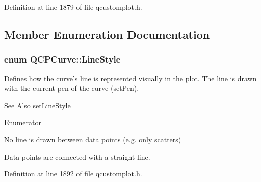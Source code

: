 Definition at line 1879 of file qcustomplot.\-h.



\subsection{Member Enumeration Documentation}
\hypertarget{class_q_c_p_curve_a2710e9f79302152cff794c6e16cc01f1}{
\subsubsection[{Line\-Style}]{\setlength{\rightskip}{0pt plus 5cm}enum {\bf Q\-C\-P\-Curve\-::\-Line\-Style}}}\label{class_q_c_p_curve_a2710e9f79302152cff794c6e16cc01f1}
Defines how the curve's line is represented visually in the plot. The line is drawn with the current pen of the curve (\hyperlink{class_q_c_p_abstract_plottable_ab74b09ae4c0e7e13142fe4b5bf46cac7}{set\-Pen}). \begin{DoxySeeAlso}{See Also}
\hyperlink{class_q_c_p_curve_a4a377ec863ff81a1875c3094a6177c19}{set\-Line\-Style} 
\end{DoxySeeAlso}
\begin{Desc}
\item[Enumerator]\par
\begin{description}
\item[{\em 
\hypertarget{class_q_c_p_curve_a2710e9f79302152cff794c6e16cc01f1aec1601a191cdf0b4e761c4c66092cc48}{ls\-None}\label{class_q_c_p_curve_a2710e9f79302152cff794c6e16cc01f1aec1601a191cdf0b4e761c4c66092cc48}
}]No line is drawn between data points (e.\-g. only scatters) \item[{\em 
\hypertarget{class_q_c_p_curve_a2710e9f79302152cff794c6e16cc01f1ade5822ce6fbf131d3df131795c2e1003}{ls\-Line}\label{class_q_c_p_curve_a2710e9f79302152cff794c6e16cc01f1ade5822ce6fbf131d3df131795c2e1003}
}]Data points are connected with a straight line. \end{description}
\end{Desc}


Definition at line 1892 of file qcustomplot.\-h.



